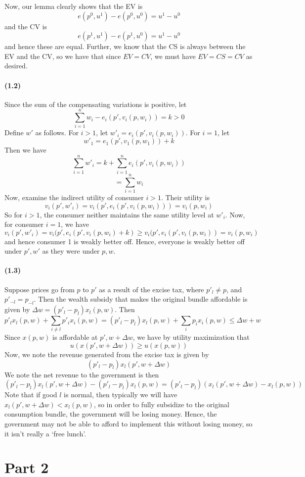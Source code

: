 \documentclass[10pt,letter]{article}
\begin{document}
Now, our lemma clearly shows that the EV is
\[ e(p^0, u^1) - e(p^0, u^0) = u^1 - u^0 \]
and the CV is
\[ e(p^1, u^1) - e(p^1, u^0) = u^1 - u^0 \]
and hence these are equal. Further, we know that the CS is always between the EV and the CV, so we have that since $EV = CV$, we must have $EV = CS = CV$ as desired.
\paragraph{(1.2)}
Since the sum of the compensating variations is positive, let
\[ \sum_{i=1}^n w_i - e_i(p', v_i(p, w_i)) = k > 0 \]
Define $w'$ as follows. For $i > 1$, let $w'_i = e_i(p', v_i(p,w_i))$. For $i=1$, let
\[ w'_1 = e_1(p', v_1(p, w_1)) + k \]
Then we have
\[ \sum_{i=1}^n w'_i = k + \sum_{i=1}^n e_i(p', v_i(p,w_i)) \]
\[ = \sum_{i=1}^n w_i \]
Now, examine the indirect utility of consumer $i > 1$. Their utility is
\[ v_i(p', w'_i) = v_i(p', e_i(p', v_i(p,w_i)) )  = v_i (p, w_i) \]
So for $i>1$, the consumer neither maintains the same utility level at $w'_i$. Now, for consumer $i=1$, we have
\[ v_i(p', w'_i) = v_i(p', e_i(p', v_i(p,w_i) + k) \ge v_i(p', e_i(p', v_i(p,w_i)) = v_i(p, w_i) \]
and hence consumer 1 is weakly better off. Hence, everyone is weakly better off under $p', w'$ as they were under $p, w$.
\paragraph{(1.3)}
Suppose prices go from $p$ to $p'$ as a result of the excise tax, where $p'_l \neq p$, and $p'_{-l} = p_{-l}$. Then the wealth subsidy that makes the original bundle affordable is given by $\Delta w = (p'_l - p_l) x_l(p, w)$. Then
\[ p'_l x_l(p,w) + \sum_{i \neq l} p'_i x_i(p,w) = (p'_l - p_l) x_l(p,w) + \sum_i p_i x_i(p,w) \le \Delta w + w  \]
Since $x(p,w)$ is affordable at $p', w+\Delta w$, we have by utility maximization that
\[ u(x(p',w+\Delta w)) \ge u(x(p,w)) \]
Now, we note the revenue generated from the excise tax is given by
\[ (p'_l - p_l) x_l(p', w+\Delta w) \]
We note the net revenue to the government is then
\[ (p'_l - p_l) x_l(p', w+\Delta w) - (p'_l - p_l) x_l(p, w) = (p'_l - p_l) (x_l(p', w+\Delta w) - x_l(p, w)) \]
Note that if good $l$ is normal, then typically we will have $x_l(p', w+\Delta w) < x_l(p,w)$, so in order to fully subsidize to the original consumption bundle, the government will be losing money. Hence, the government may not be able to afford to implement this without losing money, so it isn't really a `free lunch'.
\pagebreak
\section*{Part 2}
\end{document}

